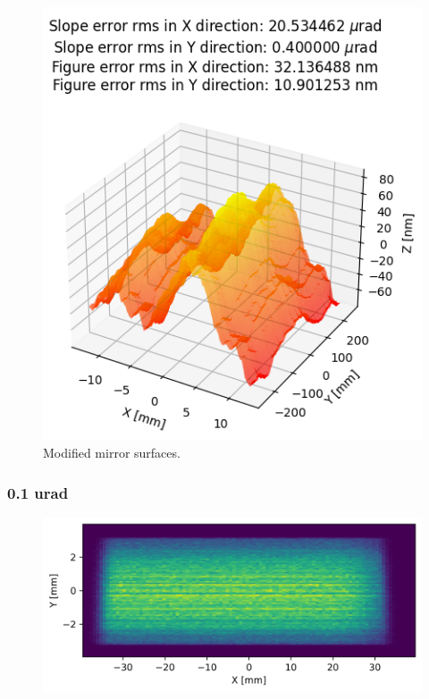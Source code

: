 \begin{figure}[!htb]
\endminipage\hfill
{}%
  \includegraphics[width=\linewidth]{./../figures/slope_error/surface_error_profile_500x25_04x20urad.png}
\endminipage
\caption{\label{fig:fractals} Modified mirror surfaces. }
\end{figure}

\clearpage
\subsubsection{0.1 urad}
\begin{figure}[H]
\centering
\includegraphics[width=0.9\linewidth]{./../figures/slope_error/WB4C_d30_d-spacing_gradient_45keV_slope_error01urad.png}
\end{figure}

